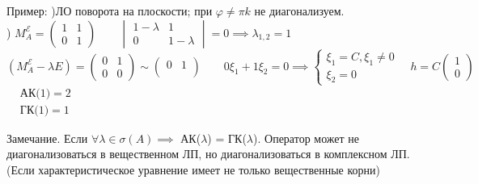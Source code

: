 \documentclass[../main.tex]{subfiles}
\begin{document}
Пример:
    )ЛО поворота на плоскости; при $\varphi\neq \pi k$ не диагонализуем.
    \\
    ) $M_{A}^{\mathcal{E}} = \begin{pmatrix}
        1 & 1 \\ 
        0 & 1
    \end{pmatrix} \qquad \begin{vmatrix}
        1 - \lambda & 1 \\ 
        0 & 1 - \lambda
    \end{vmatrix} = 0 \implies \lambda_{1,2} = 1$
\\$ (M_{A}^{\mathcal{E}} - \lambda E) = \begin{pmatrix}
        0 & 1 \\
        0 & 0
        \end{pmatrix} \sim \begin{pmatrix}
            0 & 1 \\
        \end{pmatrix}\qquad 0\xi_{1} +1\xi_{2} = 0 \implies \begin{cases}
            \xi_{1} = C, \xi_{1} \neq 0 \\ 
            \xi_{2} = 0
        \end{cases} \quad h= C\begin{pmatrix}
            1 \\
            0
        \end{pmatrix}$ \quad $\begin{aligned}
            &\text{АК(1)} = 2 \\ 
            &\text{ГК(1)} = 1 
        \end{aligned}$

Замечание. Если $ \forall \lambda\in \sigma(A)\implies $ АК($\lambda$) = ГК($\lambda$). Оператор может не диагонализоваться в вещественном ЛП, но диагонализоваться в комплексном ЛП. (Если характеристическое уравнение имеет не только вещественные корни)
\end{document}
